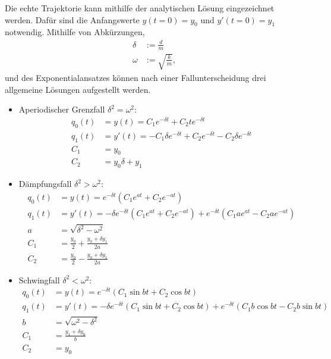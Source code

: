 \documentclass{article}
\begin{document}
    Die echte Trajektorie kann mithilfe der analytischen Lösung eingezeichnet werden. Dafür sind die Anfangswerte $y(t=0) = y_0$ und $y'(t=0) = y_1$ notwendig. Mithilfe von Abkürzungen,
    \begin{align}
        \delta &:= \frac{d}{m} \\
        \omega &:= \sqrt{\frac{k}{m}},
    \end{align}
    und des Exponentialansatzes können nach einer Fallunterscheidung drei allgemeine Lösungen aufgestellt werden.
    \begin{itemize}
        \item Aperiodischer Grenzfall $\delta^2 = \omega^2$:
            \begin{align}
                q_0(t) &= y(t) = C_1 e^{-\delta t} + C_2 t e^{-\delta t} \\
                q_1(t) &= y'(t) = -C_1 \delta e^{-\delta t} + C_2 e^{-\delta t} - C_2 \delta e^{-\delta t} \\
                C_1 &= y_0 \\
                C_2 &= y_0 \delta + y_1
            \end{align}
        \item Dämpfungsfall $\delta^2 > \omega^2$:
            \begin{align}
                q_0(t) &= y(t) = e^{-\delta t} \left( C_1 e^{a t} + C_2 e^{- a t} \right) \\
                q_1(t) &= y'(t) = -\delta e^{-\delta t} \left( C_1 e^{a t} + C_2 e^{-a t} \right) + e^{-\delta t} \left(C_1 a e^{a t} - C_2 a e^{-a t} \right) \\
                a &= \sqrt{\delta^2 - \omega^2}\\
                C_1 &= \frac{y_0}{2} + \frac{y_0 + \delta y_1}{2a}\\
                C_2 &= \frac{y_0}{2} - \frac{y_0 + \delta y_1}{2a}
            \end{align}
        \item Schwingfall $\delta^2 < \omega^2$:
            \begin{align}
                q_0(t) &= y(t) = e^{-\delta t} \left( C_1 \sin{b t} + C_2 \cos{b t} \right)\\
                q_1(t) &= y'(t) = -\delta e^{-\delta t} \left( C_1 \sin{b t} + C_2 \cos{b t} \right) + e^{-\delta t} \left( C_1 b \cos{b t} - C_2 b \sin{b t} \right)\\
                b &= \sqrt{\omega^2 - \delta^2}\\
                C_1 &= \frac{y_1 + \delta y_0}{b}\\
                C_2 &= y_0
            \end{align}
    \end{itemize}
\end{document}
